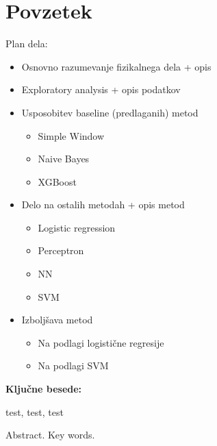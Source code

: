 \documentclass[11pt,a4paper,openany]{book}
\begin{document}










\chapter*{Povzetek}

Plan dela:
\begin{itemize}
	\item Osnovno razumevanje fizikalnega dela + opis
	\item Exploratory analysis + opis podatkov
	\item Usposobitev baseline (predlaganih) metod
		\begin{itemize}
			\item Simple Window
			\item Naive Bayes
			\item XGBoost
		\end{itemize}
	\item Delo na ostalih metodah + opis metod
		\begin{itemize}
			\item Logistic regression
			\item Perceptron
			\item NN
			\item SVM
		\end{itemize}
	\item Izboljšava metod
		\begin{itemize}
			\item Na podlagi logistične regresije
			\item Na podlagi SVM
		\end{itemize}
\end{itemize} 

\vspace{1.3cm}
\noindent
{\large \bf Ključne besede:}

\vspace{0.5cm}
\noindent test, test, test


Abstract. Key words.
\end{document}
